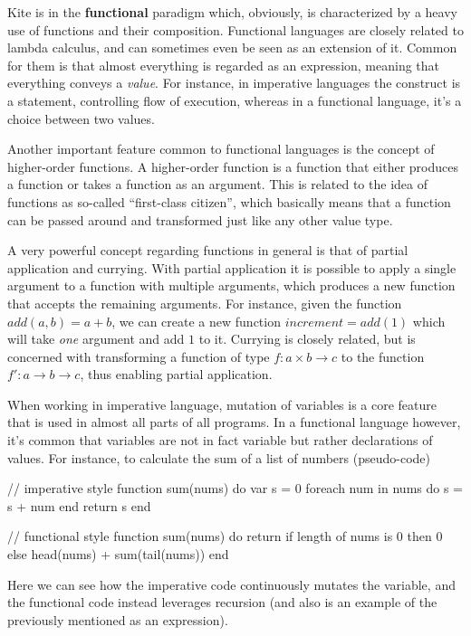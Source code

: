 Kite is in the \textbf{functional} paradigm which, obviously, is characterized by a heavy use of functions and their composition. Functional languages are closely related to lambda calculus, and can sometimes even be seen as an extension of it. Common for them is that almost everything is regarded as an expression, meaning that everything conveys a \emph{value}. For instance, in imperative languages the  construct is a statement, controlling flow of execution, whereas in a functional language, it's a choice between two values. 

Another important feature common to functional languages is the concept of higher-order functions. A higher-order function is a function that either produces a function or takes a function as an argument. This is related to the idea of functions as so-called ``first-class citizen'', which basically means that a function can be passed around and transformed just like any other value type.

A very powerful concept regarding functions in general is that of partial application and currying. With partial application it is possible to apply a single argument to a function with multiple arguments, which produces a new function that accepts the remaining arguments. For instance, given the function $add(a, b) = a + b$, we can create a new function $increment = add(1)$ which will take \emph{one} argument and add $1$ to it. Currying is closely related, but is concerned with transforming a function of type $f : a \times b \rightarrow c$ to the function $f' : a \rightarrow b \rightarrow c$, thus enabling partial application.

When working in imperative language, mutation of variables is a core feature that is used in almost all parts of all programs. In a functional language however, it's common that variables are not in fact variable but rather declarations of values. For instance, to calculate the sum of a list of numbers (pseudo-code)

\begin{pseudo}
// imperative style
function sum(nums) do
  var s = 0
  foreach num in nums do
    s = s + num
  end
  return s
end

// functional style
function sum(nums) do
  return if length of nums is 0
    then 0
    else head(nums) + sum(tail(nums))
end
\end{pseudo}

Here we can see how the imperative code continuously mutates the  variable, and the functional code instead leverages recursion (and also is an example of the previously mentioned  as an expression).

